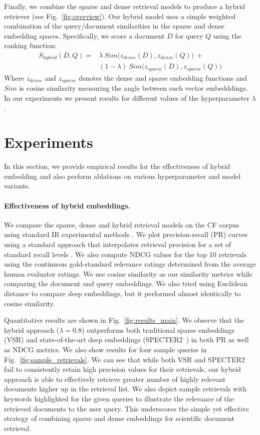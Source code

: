 \documentclass[
]{ceurart}
\begin{document}
Finally, we combine the sparse and dense retrieval models to produce a hybrid retriever (see Fig.~\ref{fig:overview}). Our hybrid model uses a simple weighted combination of the query/document similarities in the sparse and dense embedding spaces. Specifically, we score a document $D$ for query $Q$ using the ranking function:
\begin{equation}
  \begin{aligned}  
  S_{hybrid}(D,Q) = & \lambda \ Sim\big(z_{dense}(D), z_{dense}(Q)\big) \ + \\ 
  & (1 - \lambda) \ Sim\big(z_{sparse}(D), z_{sparse}(Q)\big)
  \end{aligned}
\end{equation}
Where $z_{dense}$ and $z_{sparse}$ denotes the dense and sparse embedding functions and $Sim$ is cosine similarity measuring the angle between such vector embedddings.
In our experiments we present results for different values of the hyperparameter $\lambda$.


\section{Experiments}

In this section, we provide empirical results for the effectiveness of hybrid embedding and also perform ablations on various hyperparameter and model variants. 

\paragraph{Effectiveness of hybrid embeddings.}
We compare the sparse, dense and hybrid retrieval models on the CF corpus using standard IR experimental methods \cite{manning:book08}.
We plot precision-recall (PR) curves using a standard approach that interpolates retrieval precision for a set of standard recall levels \cite{baeza-yates:book99}.  We also compute NDCG values \cite{ndcg} for the top 10 retrievals using the continuous gold-standard relevance ratings determined from the average human evaluator ratings.
We use cosine similarity as our similarity metrics while comparing the document and query embeddings.
We also tried using Euclidean distance to compare deep embeddings, but it performed almost identically to cosine similarity.

Quantitative results are shown in Fig.~\ref{fig:results_main}. We observe that the hybrid approach ($\lambda=0.8$) outperforms both traditional sparse embeddings (VSR) and state-of-the-art deep embeddings (SPECTER2~\cite{singh2023scirepeval}) in both PR as well as NDCG metrics. 
We also show results for four sample queries in Fig.~\ref{fig:sample_retrievals}. We can see that while both VSR and SPECTER2 fail to consistently retain high precision values for their retrievals, our hybrid approach is able to effectively retrieve greater number of highly relevant documents higher up in the retrieval list. We also depict sample retrievals with keywords highlighted for the given queries to illustrate the relevance of the retrieved documents to the user query.
This underscores the simple yet effective strategy of combining sparse and dense embeddings for scientific document retrieval.
\end{document}
